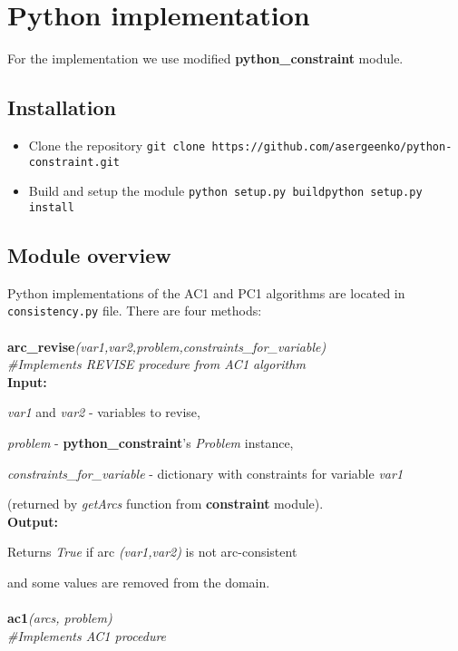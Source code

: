 \documentclass[a4paper]{article}
\begin{document}
\section{Python implementation}
For the implementation we use modified \textbf{python\_constraint} module.
\subsection{Installation}
\begin{itemize}
    \item Clone the repository \newline \texttt{git clone https://github.com/asergeenko/python-constraint.git}
    \item Build and setup the module \newline \texttt{python setup.py build}\newline \texttt{python setup.py install}
\end{itemize}
\subsection{Module overview}
Python implementations of the AC1 and PC1 algorithms are located in \texttt{consistency.py} file. There are four methods:\\\\
\textbf{arc\_revise}\textit{(var1,var2,problem,constraints\_for\_variable)}\\
\textit{\#Implements REVISE procedure from AC1 algorithm}\\

\textbf{Input:}

\textit{var1} and \textit{var2} - variables to revise,

\textit{problem} - \textbf{python\_constraint}'s \textit{Problem} instance,

\textit{constraints\_for\_variable} - dictionary with constraints for variable \textit{var1}

(returned by \textit{getArcs} function from \textbf{constraint} module).\\


\textbf{Output:}

Returns \textit{True} if arc \textit{(var1,var2)} is not arc-consistent

and some values are removed from the domain.\\\\
\textbf{ac1}\textit{(arcs, problem)}\\
\textit{\#Implements AC1 procedure}\\
 
\end{document}
